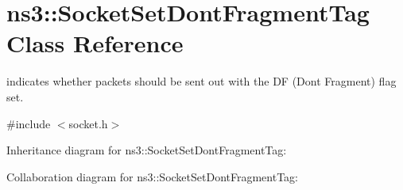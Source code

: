 \hypertarget{classns3_1_1SocketSetDontFragmentTag}{}\section{ns3\+:\+:Socket\+Set\+Dont\+Fragment\+Tag Class Reference}
\label{classns3_1_1SocketSetDontFragmentTag}


indicates whether packets should be sent out with the DF (Don\textquotesingle{}t Fragment) flag set.  




{\ttfamily \#include $<$socket.\+h$>$}



Inheritance diagram for ns3\+:\+:Socket\+Set\+Dont\+Fragment\+Tag\+:


Collaboration diagram for ns3\+:\+:Socket\+Set\+Dont\+Fragment\+Tag\+:
